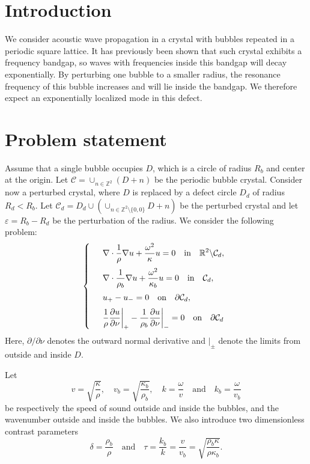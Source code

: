 \documentclass[a4paper]{article}
\author{Erik Orvehed Hiltunen}
\theoremstyle{definition}
\newcommand{\Z}{\mathbb{Z}}
\newcommand{\R}{\mathbb{R}}
\newcommand{\C}{\mathcal{C}}
\renewcommand{\epsilon}{\varepsilon}
\newcommand{\ds}{\displaystyle}
\def\nm{\noalign{\medskip}}
\begin{document}
\section{Introduction}
We consider acoustic wave propagation in a crystal with bubbles repeated in a periodic square lattice. It has previously been shown that such crystal exhibits a frequency bandgap, so waves with frequencies inside this bandgap will decay exponentially. By perturbing one bubble to a smaller radius, the resonance frequency of this bubble increases and will lie inside the bandgap. We therefore expect an exponentially localized mode in this defect.


\section{Problem statement}
Assume that a single bubble occupies $D$, which is a circle of radius $R_b$ and center at the origin. Let $\C = \cup_{n\in\Z^2}(D+n)$ be the periodic bubble crystal. Consider now a perturbed crystal, where $D$ is replaced by a defect circle $D_d$ of radius $R_d < R_b$. Let $\C_d = D_d \cup \left( \cup_{n\in\Z^2\setminus\{0,0\}} D+n \right)$ be the perturbed crystal and let $\epsilon = R_b-R_d$ be the perturbation of the radius. We consider the following problem:
\begin{equation} \label{eq:scattering}
\left\{
\begin{array} {ll}
	&\ds \nabla \cdot \frac{1}{\rho} \nabla  u+ \frac{\omega^2}{\kappa} u  = 0 \quad \text{in} \quad \R^2 \backslash \C_d, \\
	\nm
	&\ds \nabla \cdot \frac{1}{\rho_b} \nabla  u+ \frac{\omega^2}{\kappa_b} u  = 0 \quad \text{in} \quad \C_d, \\
	\nm
	&\ds  u_{+} -u_{-}  =0   \quad \text{on} \quad \partial \C_d, \\
	\nm
	& \ds  \frac{1}{\rho} \frac{\partial u}{\partial \nu} \bigg|_{+} - \frac{1}{\rho_b} \frac{\partial u}{\partial \nu} \bigg|_{-} =0 \quad \text{on} \quad \partial \C_d
\end{array}
\right.
\end{equation}
Here, $\partial/\partial \nu$ denotes the outward normal derivative and $|_\pm$ denote the limits from outside and inside $D$.  

Let
\begin{equation*} %
v = \sqrt{\frac{\kappa}{\rho}}, \quad v_b = \sqrt{\frac{\kappa_b}{\rho_b}}, \quad k= \frac{\omega}{v} \quad \text{and} \quad k_b= \frac{\omega}{v_b}
\end{equation*}
be respectively the speed of sound outside and inside the bubbles, and the wavenumber outside and inside the bubbles. We also introduce two dimensionless contrast parameters
\begin{equation*} %
\delta = \frac{\rho_b}{\rho} \quad \text{and} \quad \tau= \frac{k_b}{k}= \frac{v}{v_b} =\sqrt{\frac{\rho_b \kappa}{\rho \kappa_b}}. 
\end{equation*}
\end{document}
